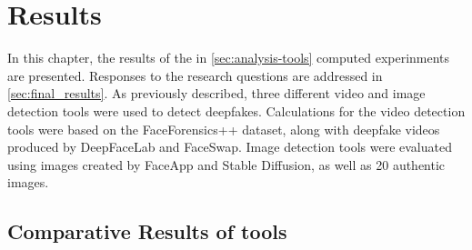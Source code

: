 
\chapter{Results}\label{chapter:results}
In this chapter, the results of the in \autoref{sec:analysis-tools} computed experinments are
presented. Responses to the research questions are addressed in \autoref{sec:final_results}. 
As previously described, three different video and image detection tools were used
to detect deepfakes. Calculations for the video detection tools were based on the
FaceForensics++ dataset, along with deepfake videos produced by DeepFaceLab and FaceSwap.
Image detection tools were evaluated using images created by FaceApp and Stable Diffusion,
as well as 20 authentic images.

\section{Comparative Results of tools}

